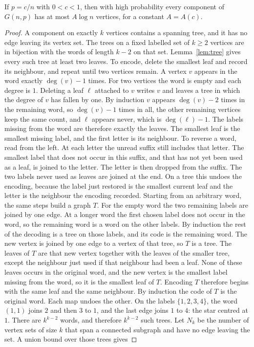 \begin{theorem}\label{thm:subcrit}
If $p=c/n$ with $0<c<1$, then with high probability every component of $G(n,p)$ has at most $A\log n$ vertices, for a constant $A=A(c)$.
\end{theorem}
\begin{proof}
A component on exactly $k$ vertices contains a spanning tree, and it has no edge leaving its vertex set. The trees on a fixed labelled set of $k\ge2$ vertices are in bijection with the words of length $k-2$ on that set. Lemma~\ref{lem:tree} gives every such tree at least two leaves. To encode, delete the smallest leaf and record its neighbour, and repeat until two vertices remain. A vertex $v$ appears in the word exactly $\deg(v)-1$ times. For two vertices the word is empty and each degree is $1$. Deleting a leaf $\ell$ attached to $v$ writes $v$ and leaves a tree in which the degree of $v$ has fallen by one. By induction $v$ appears $\deg(v)-2$ times in the remaining word, so $\deg(v)-1$ times in all, the other remaining vertices keep the same count, and $\ell$ appears never, which is $\deg(\ell)-1$. The labels missing from the word are therefore exactly the leaves. The smallest leaf is the smallest missing label, and the first letter is its neighbour. To reverse a word, read from the left. At each letter the unread suffix still includes that letter. The smallest label that does not occur in this suffix, and that has not yet been used as a leaf, is joined to the letter. The letter is then dropped from the suffix. The two labels never used as leaves are joined at the end. On a tree this undoes the encoding, because the label just restored is the smallest current leaf and the letter is the neighbour the encoding recorded. Starting from an arbitrary word, the same steps build a graph $T$. For the empty word the two remaining labels are joined by one edge. At a longer word the first chosen label does not occur in the word, so the remaining word is a word on the other labels. By induction the rest of the decoding is a tree on those labels, and its code is the remaining word. The new vertex is joined by one edge to a vertex of that tree, so $T$ is a tree. The leaves of $T$ are that new vertex together with the leaves of the smaller tree, except the neighbour just used if that neighbour had been a leaf. None of these leaves occurs in the original word, and the new vertex is the smallest label missing from the word, so it is the smallest leaf of $T$. Encoding $T$ therefore begins with the same leaf and the same neighbour. By induction the code of $T$ is the original word. Each map undoes the other. On the labels $\{1,2,3,4\}$, the word $(1,1)$ joins $2$ and then $3$ to $1$, and the last edge joins $1$ to $4$: the star centred at $1$. There are $k^{k-2}$ words, and therefore $k^{k-2}$ such trees. Let $N_k$ be the number of vertex sets of size $k$ that span a connected subgraph and have no edge leaving the set. A union bound over those trees gives

\end{proof}
